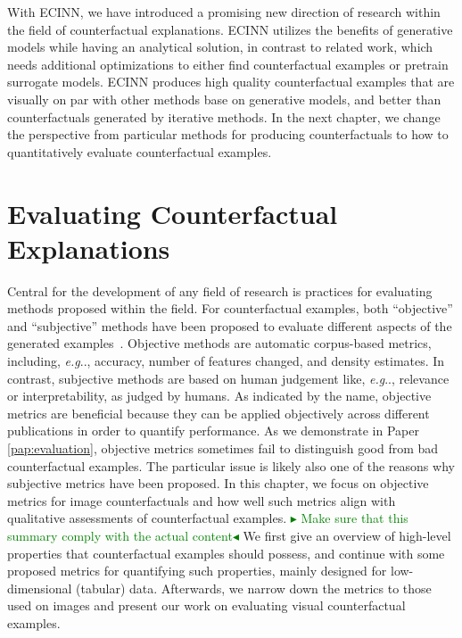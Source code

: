 \documentclass[11pt,a4paper,twoside,openright,final]{memoir}
\makeatletter
\def\ifdraft{\ifdim\overfullrule>\z@
  \expandafter\@firstoftwo\else\expandafter\@secondoftwo\fi}
\newcommand{\frederik}[1]{{
    \ifdraft{
        \textcolor{green}{\textbf{$\blacktriangleright$} #1\textbf{$\blacktriangleleft$}}
    }{}}}
\DeclareRobustCommand\onedot{\futurelet\@let@token\@onedot}
\def\@onedot{\ifx\@let@token.\else.\null\fi\xspace}
\def\eg{\emph{e.g}\onedot} \def\Eg{\emph{E.g}\onedot}
\newcommand*{\paperref}[1]{Paper \hyperref[#1]{\ref{#1}}}
\makeatother
\begin{document}
With ECINN, we have introduced a promising new direction of research within the field of counterfactual explanations. 
ECINN utilizes the benefits of generative models while having an analytical solution, in contrast to related work, which needs additional optimizations to either find counterfactual examples or pretrain surrogate models.
ECINN produces high quality counterfactual examples that are visually on par with other methods base on generative models, and better than counterfactuals generated by iterative methods.
In the next chapter, we change the perspective from particular methods for producing counterfactuals to how to quantitatively evaluate counterfactual examples. 


\chapter{Evaluating Counterfactual Explanations}\label{chap:evaluation}
Central for the development of any field of research is practices for evaluating methods proposed within the field.
For counterfactual examples, both ``objective'' and ``subjective'' methods have been proposed to evaluate different aspects of the generated examples~\cite{Stepin2021}.
Objective methods are automatic corpus-based metrics, including, \eg, accuracy, number of features changed, and density estimates.
In contrast, subjective methods are based on human judgement like, \eg, relevance or interpretability, as judged by humans.
As indicated by the name, objective metrics are beneficial because they can be applied objectively across different publications in order to quantify performance.
As we demonstrate in \paperref{pap:evaluation}, objective metrics sometimes fail to distinguish good from bad counterfactual examples.
The particular issue is likely also one of the reasons why subjective metrics have been proposed.
In this chapter, we focus on objective metrics for image counterfactuals and how well such metrics align with qualitative assessments of counterfactual examples. 
\frederik{Make sure that this summary comply with the actual content} 
We first give an overview of high-level properties that counterfactual examples should possess, and continue with some proposed metrics for quantifying such properties, mainly designed for low-dimensional (tabular) data.
Afterwards, we narrow down the metrics to those used on images and present our work on evaluating visual counterfactual examples. 
\end{document}
